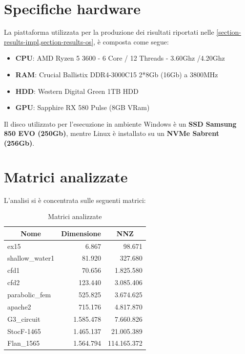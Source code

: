 \documentclass[11pt,italian]{article}
\begin{document}
\section{Specifiche hardware}
La piattaforma utilizzata per la produzione dei risultati riportati nelle \cref{section-results-impl,section-results-os}, è composta come segue:
\begin{itemize}
    \item \textbf{CPU}: AMD Ryzen 5 3600 - 6 Core / 12 Threads - 3.60Ghz /4.20Ghz
    \item \textbf{RAM}: Crucial Ballistix DDR4-3000C15 2*8Gb (16Gb) a 3800MHz
    \item \textbf{HDD}: Western Digital Green 1TB HDD
    \item \textbf{GPU}: Sapphire RX 580 Pulse (8GB VRam)
\end{itemize}

\noindent
Il disco utilizzato per l'esecuzione in ambiente Windows è un \textbf{SSD Samsung 850 EVO (250Gb)}, mentre Linux è installato su un \textbf{NVMe Sabrent (256Gb)}.

\newpage
\section{Matrici analizzate}
L'analisi si è concentrata sulle seguenti matrici:

\begin{table}[h]
    \centering
    \begin{tabular}{|l|r|r|}
        \multicolumn{1}{c}{\textbf{Nome}} & \multicolumn{1}{c}{\textbf{Dimensione}} & \multicolumn{1}{c}{\textbf{NNZ}} \\ \hline
        ex15 & 6.867 & 98.671 \\
        shallow\_water1 & 81.920 & 327.680 \\
        cfd1 & 70.656 & 1.825.580 \\
        cfd2 & 123.440 & 3.085.406 \\
        parabolic\_fem & 525.825 & 3.674.625 \\
        apache2 & 715.176 & 4.817.870 \\
        G3\_circuit & 1.585.478 & 7.660.826 \\
        StocF-1465 & 1.465.137 & 21.005.389 \\
        Flan\_1565 & 1.564.794 & 114.165.372 \\ \hline
    \end{tabular}
    \caption{Matrici analizzate}
    \label{tab:matrix-list}
\end{table}
\end{document}
